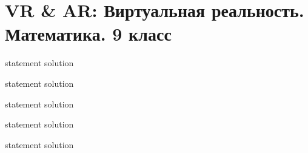 \chapter{VR \& AR: Виртуальная реальность. Математика. 9 класс}

{statement}
{solution}

{statement}
{solution}

{statement}
{solution}

{statement}
{solution}

{statement}
{solution}